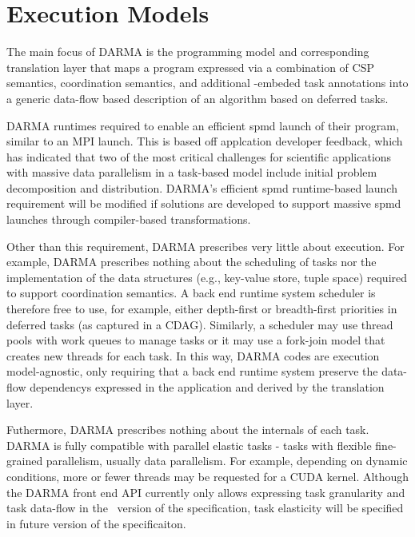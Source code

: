 

\section{Execution Models}
\label{sec:exec_model}
The main focus of \gls{DARMA} is the \gls{programming model} and corresponding
\gls{translation layer} that maps a program expressed via a combination of
\gls{CSP} semantics, \gls{coordination semantics}, and additional \CC{}-embeded task annotations into a generic data-flow based
description of an algorithm based on deferred tasks.

\gls{DARMA} runtimes required to enable an efficient
\gls{spmd} launch of their program, similar to an MPI launch.
This is based off applcation developer feedback, which has indicated that 
two of the most critical challenges for scientific applications with massive data parallelism in a task-based model
include initial problem decomposition and distribution.
\gls{DARMA}'s efficient \gls{spmd} runtime-based launch requirement 
will be modified if solutions are developed to support massive \gls{spmd} launches
through compiler-based transformations.

Other than this requirement, \gls{DARMA} prescribes very little
about execution.
For example, \gls{DARMA} prescribes nothing about the scheduling of tasks nor the implementation 
of the data structures (e.g., \gls{key-value store}, \gls{tuple space})
  required to support \gls{coordination semantics}.
A \gls{back end} \gls{runtime system} scheduler is therefore free to use, for example,
either depth-first or breadth-first priorities in deferred tasks (as captured
in a \gls{CDAG}).
Similarly, a scheduler may use \glspl{thread pool} with work queues to manage
tasks or it may use a \gls{fork-join} model that creates new threads for each task.
In this way, \gls{DARMA} codes are \gls{execution model}-agnostic, only
requiring that a \gls{back end} \gls{runtime system} preserve the
\glspl{data-flow dependency} expressed in the application and derived by the
\gls{translation layer}.

Futhermore, \gls{DARMA} prescribes nothing about the internals of each task.
\gls{DARMA} is fully compatible with parallel elastic tasks - tasks with
flexible fine-grained parallelism, usually \gls{data parallelism}.
For example, depending on dynamic conditions, more or fewer threads may be
requested for a \gls{CUDA} kernel.
Although the \gls{DARMA} \gls{front end} \gls{API} currently only allows
expressing task granularity and task data-flow in the \specVersion\ version of
the specification, task elasticity will be specified in future version of the
specificaiton.


